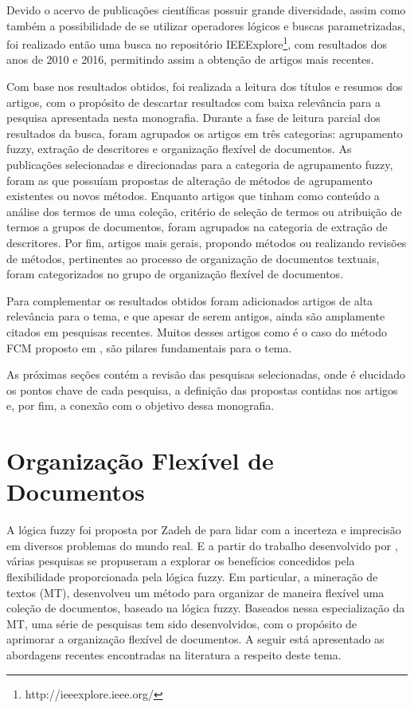Devido o acervo de publicações científicas possuir grande diversidade, assim como também a
possibilidade de se utilizar operadores lógicos e buscas parametrizadas, foi realizado então uma
busca no repositório IEEExplore\footnote{http://ieeexplore.ieee.org/}, com resultados dos
anos de 2010 e 2016, permitindo assim a obtenção de artigos mais recentes.

Com base nos resultados obtidos, foi realizada a leitura dos títulos e resumos dos artigos, com o
propósito de descartar resultados com baixa relevância para a pesquisa apresentada nesta monografia.  Durante a fase de
leitura parcial dos resultados da busca, foram agrupados os artigos em três categorias: agrupamento
fuzzy, extração de descritores e organização flexível de documentos.  As publicações selecionadas e
direcionadas para a categoria de agrupamento fuzzy, foram as que possuíam propostas de alteração de
métodos de agrupamento existentes ou novos métodos. Enquanto artigos que tinham como conteúdo a
análise dos termos de uma coleção, critério de seleção de termos ou atribuição de termos a grupos de
documentos, foram agrupados na categoria de extração de descritores. Por fim, artigos mais gerais,
propondo métodos ou realizando revisões de métodos, pertinentes ao processo de organização de
documentos textuais, foram categorizados no grupo de organização flexível de documentos.

Para complementar os resultados obtidos foram adicionados artigos de alta relevância para o tema, e
que apesar de serem antigos, ainda são amplamente citados em pesquisas recentes. Muitos desses
artigos como é o caso do método FCM proposto em \cite{Bezdek1984}, são pilares fundamentais para o
tema.

As próximas seções contém a revisão das pesquisas selecionadas, onde é elucidado os pontos chave
de cada pesquisa, a definição das propostas contidas nos artigos e, por fim, a conexão com o objetivo
dessa monografia.

\section{Organização Flexível de Documentos}

A lógica fuzzy foi proposta por Zadeh \cite{Zadeh1965} de para lidar com a incerteza e
imprecisão em diversos problemas do mundo real. E a partir do trabalho desenvolvido por
\citeauthor{Zadeh1965}, várias pesquisas se propuseram a explorar os benefícios concedidos pela
flexibilidade proporcionada pela lógica fuzzy. Em particular, a mineração de textos (MT),
desenvolveu um método para organizar de maneira flexível uma coleção de documentos, baseado na
lógica fuzzy. Baseados nessa especialização da MT, uma série de pesquisas tem sido desenvolvidos,
com o propósito de aprimorar a organização flexível de documentos. A seguir está apresentado as
abordagens recentes encontradas na literatura a respeito deste tema.

